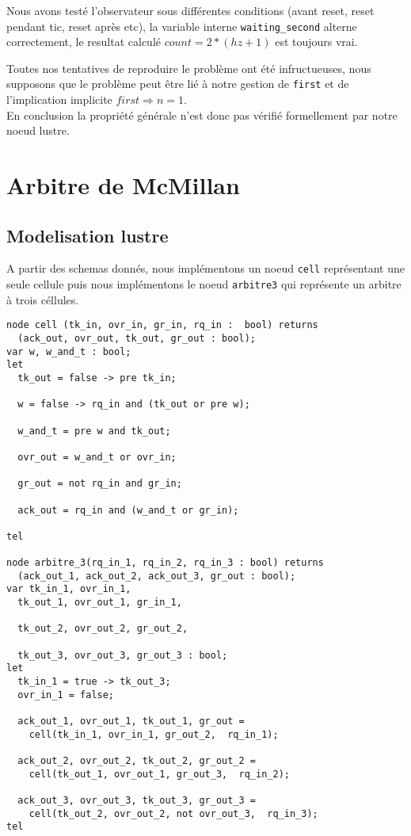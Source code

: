 \documentclass[a4paper]{article}
\begin{document}
Nous avons testé l'observateur sous différentes conditions (avant reset, reset 
pendant tic, reset après etc), la variable interne \texttt{waiting\_second}
alterne correctement, le resultat calculé $count = 2 * (hz + 1)$ est toujours vrai.

Toutes nos tentatives de reproduire le problème ont été infructueuses, nous supposons
que le problème peut être lié à notre gestion de \texttt{first} et de l'implication
implicite $first \Rightarrow n = 1$. \\

En conclusion la propriété générale n'est donc pas vérifié formellement par notre noeud lustre.

\section{Arbitre de McMillan}

\subsection{Modelisation lustre}
A partir des schemas donnés, nous implémentons un noeud \texttt{cell} représentant 
une seule cellule puis nous implémentons le noeud \texttt{arbitre3} qui représente
un arbitre à trois céllules.\\

\begin{verbatim}
node cell (tk_in, ovr_in, gr_in, rq_in :  bool) returns
  (ack_out, ovr_out, tk_out, gr_out : bool);
var w, w_and_t : bool;  
let 
  tk_out = false -> pre tk_in;  

  w = false -> rq_in and (tk_out or pre w);

  w_and_t = pre w and tk_out;

  ovr_out = w_and_t or ovr_in;

  gr_out = not rq_in and gr_in;
  
  ack_out = rq_in and (w_and_t or gr_in); 

tel

node arbitre_3(rq_in_1, rq_in_2, rq_in_3 : bool) returns 
  (ack_out_1, ack_out_2, ack_out_3, gr_out : bool);
var tk_in_1, ovr_in_1,
  tk_out_1, ovr_out_1, gr_in_1,
    
  tk_out_2, ovr_out_2, gr_out_2,

  tk_out_3, ovr_out_3, gr_out_3 : bool;
let
  tk_in_1 = true -> tk_out_3;
  ovr_in_1 = false;

  ack_out_1, ovr_out_1, tk_out_1, gr_out = 
    cell(tk_in_1, ovr_in_1, gr_out_2,  rq_in_1);

  ack_out_2, ovr_out_2, tk_out_2, gr_out_2 = 
    cell(tk_out_1, ovr_out_1, gr_out_3,  rq_in_2);

  ack_out_3, ovr_out_3, tk_out_3, gr_out_3 = 
    cell(tk_out_2, ovr_out_2, not ovr_out_3,  rq_in_3);
tel
\end{verbatim}
\end{document}
